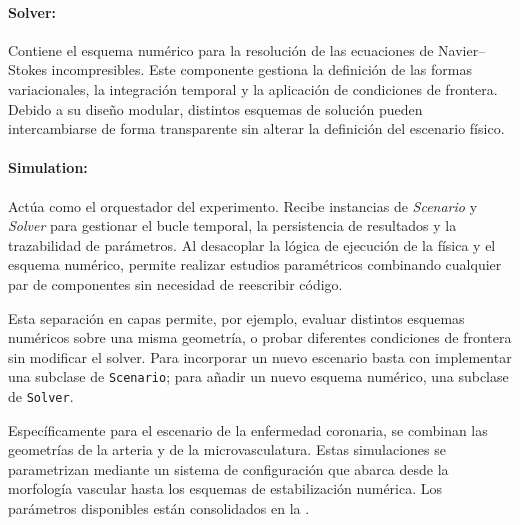 \documentclass[12pt, letterpaper]{article}
\begin{document}
\paragraph{Solver:} Contiene el esquema numérico para la resolución de las ecuaciones de Navier--Stokes incompresibles. Este componente gestiona la definición de las formas variacionales, la integración temporal y la aplicación de condiciones de frontera. Debido a su diseño modular, distintos esquemas de solución pueden intercambiarse de forma transparente sin alterar la definición del escenario físico.

\paragraph{Simulation:} Actúa como el orquestador del experimento. Recibe instancias de \textit{Scenario} y \textit{Solver} para gestionar el bucle temporal, la persistencia de resultados y la trazabilidad de parámetros. Al desacoplar la lógica de ejecución de la física y el esquema numérico, permite realizar estudios paramétricos combinando cualquier par de componentes sin necesidad de reescribir código.

Esta separación en capas permite, por ejemplo, evaluar distintos esquemas numéricos sobre una misma geometría, o probar diferentes condiciones de frontera sin modificar el solver. Para incorporar un nuevo escenario basta con implementar una subclase de \texttt{Scenario}; para añadir un nuevo esquema numérico, una subclase de \texttt{Solver}.

Específicamente para el escenario de la enfermedad coronaria, se combinan las geometrías de la arteria y de la microvasculatura. Estas simulaciones se parametrizan mediante un sistema de configuración que abarca desde la morfología vascular hasta los esquemas de estabilización numérica. Los parámetros disponibles están consolidados en la .
\end{document}
